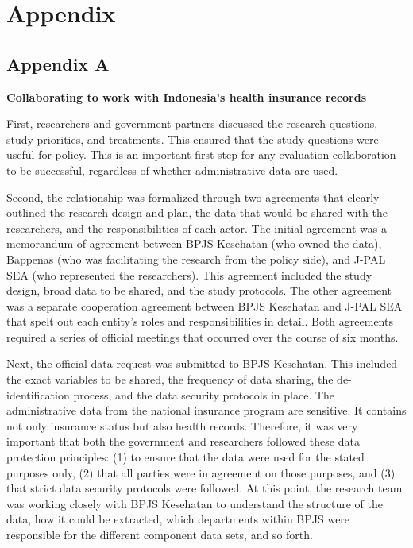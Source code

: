 \putbib

\FloatBarrier\newpage

\hypertarget{indonesia-appendix}{%
\section*{Appendix}\label{indonesia-appendix}}

\hypertarget{indonesia-appendixa}{%
\subsection*{Appendix A}\label{indonesia-appendixa}}

\textbf{Collaborating to work with Indonesia's health insurance records}

First, researchers and government partners discussed the research questions, study priorities, and treatments. This ensured that the study questions were useful for policy. This is an important first step for any evaluation collaboration to be successful, regardless of whether administrative data are used.

Second, the relationship was formalized through two agreements that clearly outlined the research design and plan, the data that would be shared with the researchers, and the responsibilities of each actor. The initial agreement was a memorandum of agreement between BPJS Kesehatan (who owned the data), Bappenas (who was facilitating the research from the policy side), and J-PAL SEA (who represented the researchers). This agreement included the study design, broad data to be shared, and the study protocols. The other agreement was a separate cooperation agreement between BPJS Kesehatan and J-PAL SEA that spelt out each entity's roles and responsibilities in detail. Both agreements required a series of official meetings that occurred over the course of six months.

Next, the official data request was submitted to BPJS Kesehatan. This included the exact variables to be shared, the frequency of data sharing, the de-identification process, and the data security protocols in place. The administrative data from the national insurance program are sensitive. It contains not only insurance status but also health records. Therefore, it was very important that both the government and researchers followed these data protection principles: (1) to ensure that the data were used for the stated purposes only, (2) that all parties were in agreement on those purposes, and (3) that strict data security protocols were followed. At this point, the research team was working closely with BPJS Kesehatan to understand the structure of the data, how it could be extracted, which departments within BPJS were responsible for the different component data sets, and so forth.

